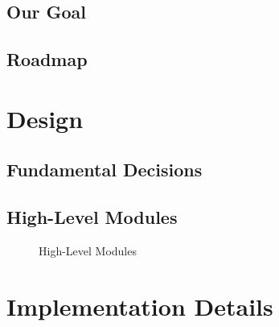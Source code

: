 \documentclass[12pt,a4paper]{article}
\let\oldsection\section
\renewcommand\section{\clearpage\oldsection}
\begin{document}

\subsection{Our Goal}


\subsection{Roadmap}


\section{Design}\label{sec:architecture}

\subsection{Fundamental Decisions}\label{sec:fundamental_decisions}



\subsection{High-Level Modules}\label{sec:hl_design}


\begin{figure}[htb]
\centering

\caption{High-Level Modules}
\end{figure}



\section{Implementation Details}\label{sec:implementation_details}
\end{document}
